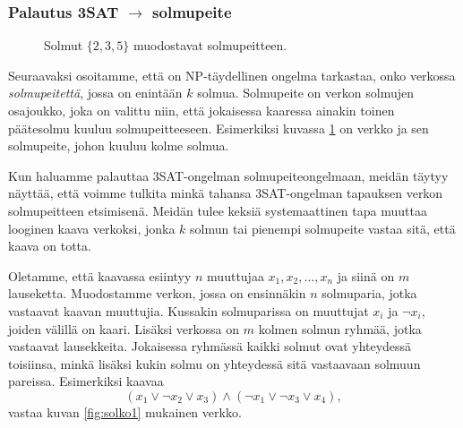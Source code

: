 \subsubsection{Palautus 3SAT $\rightarrow$ solmupeite}

\begin{figure}
\center
\begin{center}
\end{center}
\caption{Solmut $\{2,3,5\}$ muodostavat solmupeitteen.}
\label{fig:solpei}
\end{figure}

Seuraavaksi osoitamme, että on NP-täydellinen ongelma tarkastaa,
onko verkossa \emph{solmupeitettä}, jossa on enintään $k$ solmua.
Solmupeite on verkon solmujen osajoukko, joka on valittu niin,
että jokaisessa kaaressa ainakin toinen päätesolmu kuuluu
solmupeitteeseen.
Esimerkiksi kuvassa \ref{fig:solpei} on verkko ja sen solmupeite,
johon kuuluu kolme solmua.

Kun haluamme palauttaa 3SAT-ongelman solmupeiteongelmaan,
meidän täytyy näyttää, että voimme tulkita minkä tahansa
3SAT-ongelman tapauksen verkon solmupeitteen etsimisenä.
Meidän tulee keksiä systemaattinen tapa
muuttaa looginen kaava verkoksi,
jonka $k$ solmun tai pienempi solmupeite vastaa sitä, että kaava on totta.

Oletamme, että kaavassa esiintyy $n$ muuttujaa $x_1,x_2,\dots,x_n$
ja siinä on $m$ lauseketta.
Muodostamme verkon, jossa on ensinnäkin $n$ solmuparia,
jotka vastaavat kaavan muuttujia.
Kussakin solmuparissa on muuttujat $x_i$ ja $\neg x_i$,
joiden välillä on kaari.
Lisäksi verkossa on $m$ kolmen solmun ryhmää,
jotka vastaavat lausekkeita.
Jokaisessa ryhmässä kaikki solmut ovat yhteydessä toisiinsa,
minkä lisäksi kukin solmu on yhteydessä sitä vastaavaan solmuun pareissa.
Esimerkiksi kaavaa
\[(x_1 \lor \neg x_2 \lor x_3) \land (\neg x_1 \lor \neg x_3 \lor x_4),\]
vastaa kuvan \ref{fig:solko1} mukainen verkko.

